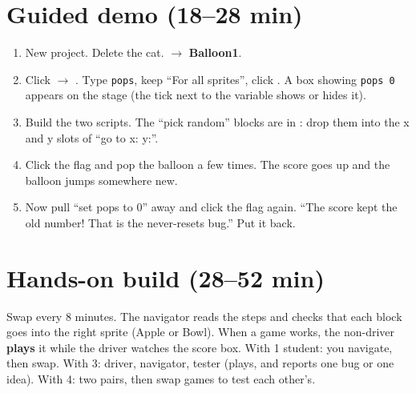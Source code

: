 \section{Guided demo (18--28 min)}
\begin{workedexample}
\begin{enumerate}[leftmargin=1.4em,itemsep=1pt]
  \item New project. Delete the cat.  $\rightarrow$ \textbf{Balloon1}.
  \item Click  $\rightarrow$ . Type \texttt{pops}, keep \enquote{For all sprites}, click . A box showing \texttt{pops 0} appears on the stage (the tick next to the variable shows or hides it).
  \item Build the two scripts. The \enquote{pick random} blocks are in : drop them into the x and y slots of \enquote{go to x: y:}.
  \item Click the flag and pop the balloon a few times. The score goes up and the balloon jumps somewhere new.
  \item Now pull \enquote{set pops to 0} away and click the flag again. \enquote{The score kept the old number! That is the never-resets bug.} Put it back.
\end{enumerate}
\begin{center}
\begin{scratch}[scale=0.8]
\end{scratch}
\hspace{0.5cm}
\begin{scratch}[scale=0.8]
\end{scratch}
\end{center}
\end{workedexample}

\section{Hands-on build (28--52 min)}
\begin{pairroles}
Swap every 8 minutes. The navigator reads the steps and checks that each block goes into the right sprite (Apple or Bowl). When a game works, the non-driver \textbf{plays} it while the driver watches the score box. With 1 student: you navigate, then swap. With 3: driver, navigator, tester (plays, and reports one bug or one idea). With 4: two pairs, then swap games to test each other's.
\end{pairroles}

